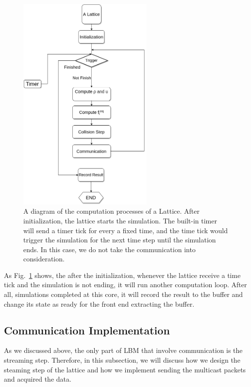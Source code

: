 \begin{figure}[!tb]
   \centering
       \includegraphics[width=0.6\textwidth]{figures/computation.png}
       \caption{A diagram of the computation processes of a Lattice. After initialization, the lattice starts the simulation. The built-in timer will send a timer tick for every a fixed time, and the time tick would trigger the simulation for the next time step until the simulation ends. In this case, we do not take the communication into consideration.}
       \label{fig:computation}
\end{figure}

As Fig.~\ref{fig:computation} shows, the after the initialization, whenever the lattice receive a time tick and the simulation is not ending, it will run another computation loop. After all, simulations completed at this core, it will record the result to the buffer and change its state as ready for the front end extracting the buffer.\\

\subsection{Communication Implementation} \label{sec:ssc}
As we discussed above, the only part of LBM that involve communication is the streaming step. Therefore, in this subsection, we will discuss how we design the steaming step of the lattice and how we implement sending the multicast packets and acquired the data.\\
